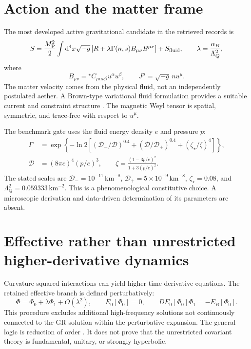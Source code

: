 \documentclass[11pt,oneside]{report}
\newcommand{\dd}{\mathrm d}
\newcommand{\MP}{M_{\mathrm P}}
\begin{document}
\section{Action and the matter frame}
The most developed active gravitational candidate in the retrieved records is
\begin{equation}\label{eq:active}
S=\frac{\MP^2}{2}\int\dd^4x\sqrt{-g}
\left[R+\lambda\Gamma(n,s)B_{\mu\nu}B^{\mu\nu}\right]+S_{\rm fluid},
\qquad \lambda=\frac{\alpha_B}{\Lambda_Q^2},
\end{equation}
where
\begin{equation}
B_{\mu\nu}={}^\star C_{\mu\alpha\nu\beta}u^\alpha u^\beta,
\qquad J^\mu=\sqrt{-g}\,n u^\mu.
\end{equation}
The matter velocity comes from the physical fluid, not an independently postulated aether. A Brown-type variational fluid formulation provides a suitable current and constraint structure \cite{Brown}. The magnetic Weyl tensor is spatial, symmetric, and trace-free with respect to $u^\mu$.

The benchmark gate uses the fluid energy density $e$ and pressure $p$:
\begin{align}
\Gamma&=\exp\left\{-\ln2\left[
(\mathcal D_-/\mathcal D)^{0.4}+(\mathcal D/\mathcal D_+)^{0.4}
+(\zeta_\star/\zeta)^4\right]\right\},\\
\mathcal D&=(8\pi e)^4(p/e)^3,
\qquad \zeta=\frac{(1-3p/e)^2}{1+3(p/e)^2}.
\end{align}
The stated scales are $\mathcal D_-=10^{-11}\,\mathrm{km}^{-8}$, $\mathcal D_+=5\times10^{-9}\,\mathrm{km}^{-8}$, $\zeta_\star=0.08$, and $\Lambda_Q^2=0.059333\,\mathrm{km}^{-2}$. This is a phenomenological constitutive choice. A microscopic derivation and data-driven determination of its parameters are absent.

\section{Effective rather than unrestricted higher-derivative dynamics}
Curvature-squared interactions can yield higher-time-derivative equations. The retained effective branch is defined perturbatively:
\begin{equation}
\Phi=\Phi_0+\lambda\Phi_1+O(\lambda^2),\qquad
E_0[\Phi_0]=0,\qquad DE_0[\Phi_0]\Phi_1=-E_B[\Phi_0].
\end{equation}
This procedure excludes additional high-frequency solutions not continuously connected to the GR solution within the perturbative expansion. The general logic is reduction of order \cite{ParkerSimon}. It does not prove that the unrestricted covariant theory is fundamental, unitary, or strongly hyperbolic.
\end{document}
